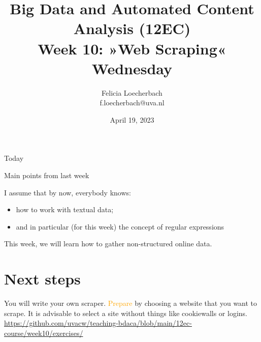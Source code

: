 

\graphicspath{{../../resources/img/}}




\title[Big Data and Automated Content Analysis]{\textbf{Big Data and Automated Content Analysis (12EC)} 
\\Week 10: »Web Scraping«
\\Wednesday}
\author[Felicia Loecherbach]{Felicia Loecherbach\\ \footnotesize{f.loecherbach@uva.nl \\}}
\date{April 19, 2023}


\begin{frame}{}
	\titlepage
\end{frame}

\begin{frame}{Today}
	\tableofcontents
\end{frame}





\begin{frame}{Main points from last week}

\begin{alertblock}{I assume that by now, everybody knows:}
\begin{itemize}
\item how to work with textual data;
\item and in particular (for this week) the concept of regular expressions
\end{itemize}
\end{alertblock}
\end{frame}


\begin{frame}[standout]
This week, we will learn how to gather non-structured online data.
\end{frame}














\section{Next steps}

\begin{frame}[standout]
You will write your own scraper. \textcolor{orange}{Prepare} by choosing a website that you want to scrape. It is advisable to select a site without things like cookiewalls or logins.
\large{\url{https://github.com/uvacw/teaching-bdaca/blob/main/12ec-course/week10/exercises/}}
\end{frame}





\begin{frame}
	\printbibliography
\end{frame}




